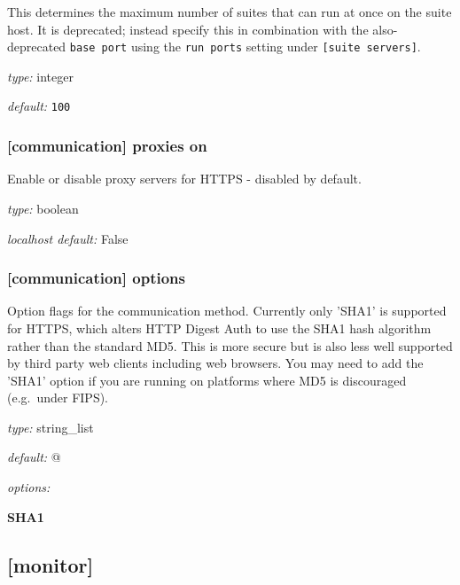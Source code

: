 This determines the maximum number of suites that can run at once on the
suite host. It is deprecated; instead specify this in combination with the
also-deprecated \lstinline=base port= using the \lstinline=run ports=
setting under \lstinline=[suite servers]=.

\begin{myitemize}
\item {\em type:} integer
\item {\em default:} \lstinline=100=
\end{myitemize}

\subsubsection[proxies on]{[communication] \textrightarrow proxies on}

Enable or disable proxy servers for HTTPS - disabled by default.

\begin{myitemize}
\item {\em type:} boolean
\item {\em localhost default:} False
\end{myitemize}

\subsubsection[options]{[communication] \textrightarrow options}

Option flags for the communication method. Currently only 'SHA1' is
supported for HTTPS, which alters HTTP Digest Auth to use the SHA1 hash
algorithm rather than the standard MD5. This is more secure but is also
less well supported by third party web clients including web browsers.
You may need to add the 'SHA1' option if you are running on platforms
where MD5 is discouraged (e.g.\  under FIPS).

\begin{myitemize}
\item {\em type:} string\_list
\item {\em default:} \lstinline@[]@
\item {\em options:}
    \begin{myitemize}
        \item {\bf SHA1}
    \end{myitemize}
\end{myitemize}

\subsection{[monitor]}

